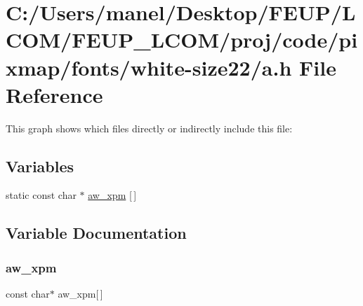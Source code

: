 \hypertarget{white-size22_2a_8h}{}\section{C\+:/\+Users/manel/\+Desktop/\+F\+E\+U\+P/\+L\+C\+O\+M/\+F\+E\+U\+P\+\_\+\+L\+C\+O\+M/proj/code/pixmap/fonts/white-\/size22/a.h File Reference}
\label{white-size22_2a_8h}
This graph shows which files directly or indirectly include this file\+:
\subsection*{Variables}
\begin{DoxyCompactItemize}
\item 
static const char $\ast$ \mbox{\hyperlink{white-size22_2a_8h_a79e0000304303e37edda272402499644}{aw\+\_\+xpm}} \mbox{[}$\,$\mbox{]}
\end{DoxyCompactItemize}


\subsection{Variable Documentation}
\mbox{\label{white-size22_2a_8h_a79e0000304303e37edda272402499644}} 
\subsubsection{\texorpdfstring{aw\_xpm}{aw\_xpm}}
{\footnotesize\ttfamily const char$\ast$ aw\+\_\+xpm\mbox{[}$\,$\mbox{]}\hspace{0.3cm}{\ttfamily [static]}}

